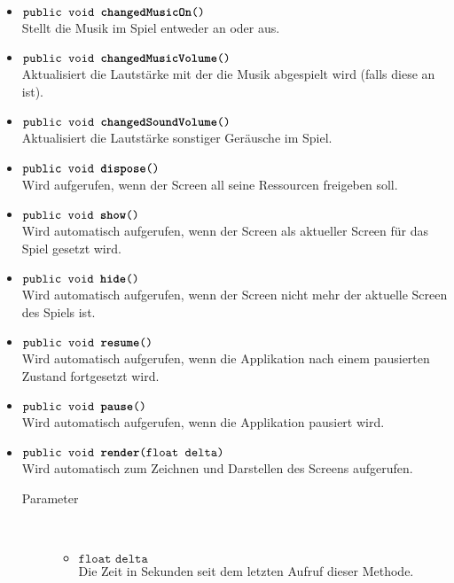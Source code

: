 \begin{description}
\begin{itemize}
		\item $\texttt{public void \textbf{changedMusicOn}()}$ \\ Stellt die Musik im Spiel entweder an oder aus.
				
		\item $\texttt{public void \textbf{changedMusicVolume}()}$ \\ Aktualisiert die Lautstärke mit der die Musik abgespielt wird (falls diese an ist).
		
		\item $\texttt{public void \textbf{changedSoundVolume}()}$ \\ Aktualisiert die Lautstärke sonstiger Geräusche im Spiel.
				
		\item $\texttt{public void \textbf{dispose}()}$ \\ Wird aufgerufen, wenn der Screen all seine Ressourcen freigeben soll.
		
		\item $\texttt{public void \textbf{show}()}$ \\ Wird automatisch aufgerufen, wenn der Screen als aktueller Screen für das Spiel gesetzt wird.
	
		\item $\texttt{public void \textbf{hide}()}$ \\ Wird automatisch aufgerufen, wenn der Screen nicht mehr der aktuelle Screen des Spiels ist.
	
		\item $\texttt{public void \textbf{resume}()}$ \\ Wird automatisch aufgerufen, wenn die Applikation nach einem pausierten Zustand fortgesetzt wird.	
	
		\item $\texttt{public void \textbf{pause}()}$ \\ Wird automatisch aufgerufen, wenn die Applikation pausiert wird.
	
		\item $\texttt{public void \textbf{render}(float delta)}$ \\ Wird automatisch zum Zeichnen und Darstellen des Screens aufgerufen.
		\begin{description}
			\item[Parameter] \hfill \\
			\vspace{-.8cm}
			\begin{itemize}
				\item $\texttt{float delta}$ \\ Die Zeit in Sekunden seit dem letzten Aufruf dieser Methode.
			\end{itemize}
		\end{description}	
	

\end{itemize}
\end{description}
